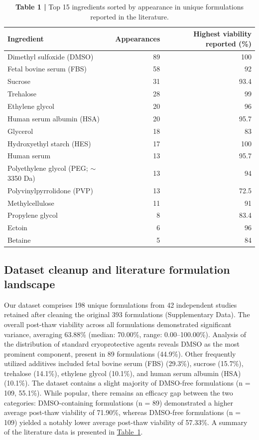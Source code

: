 \documentclass[11pt]{article}
\newcommand{\tabref}[1]{\hyperref[tab:#1]{Table~#1}}
\begin{document}
\vspace{1.2em}
\begin{table}[H]
\centering
{}\label{tab:1}
\caption*{\textbf{Table 1 | }Top 15 ingredients sorted by appearance in unique formulations reported in the literature.}
\begin{tabular}{@{}lrr@{}}
\toprule
\textbf{Ingredient} & \textbf{Appearances} & \textbf{Highest viability reported (\%)} \\
\midrule
Dimethyl sulfoxide (DMSO) & 89 & 100 \\
Fetal bovine serum (FBS) & 58 & 92 \\
Sucrose & 31 & 93.4 \\
Trehalose & 28 & 99 \\
Ethylene glycol & 20 & 96 \\
Human serum albumin (HSA) & 20 & 95.7 \\
Glycerol & 18 & 83 \\
Hydroxyethyl starch (HES) & 17 & 100 \\
Human serum & 13 & 95.7 \\
Polyethylene glycol (PEG; $\sim$3350 Da) & 13 & 94 \\
Polyvinylpyrrolidone (PVP) & 13 & 72.5 \\
Methylcellulose & 11 & 91 \\
Propylene glycol & 8 & 83.4 \\
Ectoin & 6 & 96 \\
Betaine & 5 & 84 \\
\bottomrule
\end{tabular}
\end{table}

\subsection{Dataset cleanup and literature formulation landscape}

Our dataset comprises 198 unique formulations from 42 independent studies retained after cleaning the original 393 formulations (Supplementary Data). The overall post-thaw viability across all formulations demonstrated significant variance, averaging 63.88\% (median: 70.00\%, range: 0.00--100.00\%). Analysis of the distribution of standard cryoprotective agents reveals DMSO as the most prominent component, present in 89 formulations (44.9\%). Other frequently utilized additives included fetal bovine serum (FBS) (29.3\%), sucrose (15.7\%), trehalose (14.1\%), ethylene glycol (10.1\%), and human serum albumin (HSA) (10.1\%). The dataset contains a slight majority of DMSO-free formulations (n = 109, 55.1\%). While popular, there remains an efficacy gap between the two categories: DMSO-containing formulations (n = 89) demonstrated a higher average post-thaw viability of 71.90\%, whereas DMSO-free formulations (n = 109) yielded a notably lower average post-thaw viability of 57.33\%. A summary of the literature data is presented in \tabref{1}.
\end{document}
